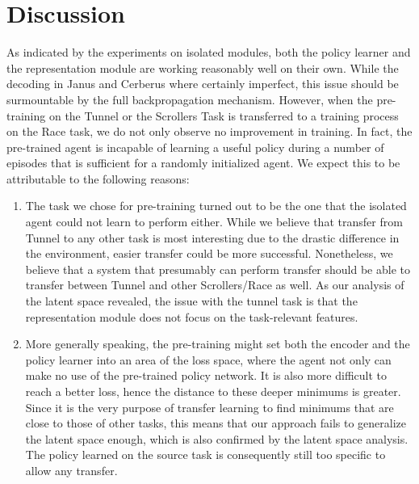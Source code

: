 \section{Discussion}
\label{sec:discussion}

As indicated by the experiments on isolated modules, both the policy learner and the representation module are working reasonably well on their own. While the decoding in Janus and Cerberus where certainly imperfect, this issue should be surmountable by the full backpropagation mechanism. However, when the pre-training on the Tunnel or the Scrollers Task is transferred to a training process on the Race task, we do not only observe no improvement in training. In fact, the pre-trained agent is incapable of learning a useful policy during a number of episodes that is sufficient for a randomly initialized agent. We expect this to be attributable to the following reasons:

\begin{enumerate}[i]
    \item The task we chose for pre-training turned out to be the one that the isolated agent could not learn to perform either. While we believe that transfer from Tunnel to any other task is most interesting due to the drastic difference in the environment, easier transfer could be more successful. Nonetheless, we believe that a system that presumably can perform transfer should be able to transfer between Tunnel and other Scrollers/Race as well. As our analysis of the latent space revealed, the issue with the tunnel task is that the representation module does not focus on the task-relevant features.

    \item More generally speaking, the pre-training might set both the encoder and the policy learner into an area of the loss space, where the agent not only can make no use of the pre-trained policy network. It is also more difficult to reach a better loss, hence the distance to these deeper minimums is greater. Since it is the very purpose of transfer learning to find minimums that are close to those of other tasks, this means that our approach fails to generalize the latent space enough, which is also confirmed by the latent space analysis. The policy learned on the source task is consequently still too specific to allow any transfer.
\end{enumerate}

